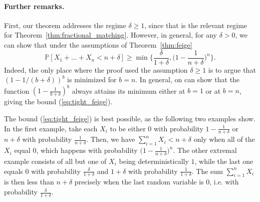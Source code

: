 \documentclass[10pt,a4paper]{article}
\newcommand{\Pb}{\mathbb P}
\begin{document}
\vspace{-1.2cm}

\paragraph{Further remarks.} First, our theorem addresses the regime $\delta\geq 1$, since that is the relevant regime for Theorem~\ref{thm:fractional_matching}. However, in general, for any $\delta>0$, we can show that under the assumptions of Theorem~\ref{thm:feige}
\begin{equation}\label{eq:tight_feige}
    \Pb[X_1+\dots+X_n<n+\delta]\geq \min\Big\{\frac{\delta}{1+\delta}, \Big(1-\frac{1}{n+\delta}\Big)^n\Big\}.
\end{equation}
Indeed, the only place where the proof used the assumption $\delta\geq 1$ is to argue that $(1-1/(b+\delta))^b$ is minimized for $b=n$. In general, on can show that the function $(1-\frac{1}{b+\delta})^b$ always attains its minimum either at $b=1$ or at $b=n$, giving the bound (\ref{eq:tight_feige}).

The bound (\ref{eq:tight_feige}) is best possible, as the following two examples show. In the first example, take each $X_i$ to be either $0$ with probability $1-\frac{1}{n+\delta}$ or $n+\delta$ with probability $\frac{1}{n+\delta}$. Then, we have $\sum_{i=1}^n X_i<n+\delta$ only when all of the $X_i$ equal $0$, which happens with probability $\big(1-\frac{1}{n+\delta}\big)^n$. The other extremal example consists of all but one of $X_i$ being deterministically $1$, while the last one equals $0$ with probability $\frac{\delta}{1+\delta}$ and $1+\delta$ with probability $\frac{1}{1+\delta}$. The sum $\sum_{i=1}^n X_i$ is then less than $n+\delta$ precisely when the last random variable is $0$, i.e. with probability $\frac{\delta}{1+\delta}$.



\end{document}
